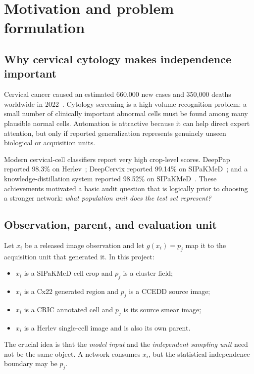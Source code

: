 \documentclass[11pt,oneside]{report}
\begin{document}
\chapter{Motivation and problem formulation}

\section{Why cervical cytology makes independence important}

Cervical cancer caused an estimated 660,000 new cases and 350,000 deaths worldwide in 2022~\cite{who2025hpv}. Cytology screening is a high-volume recognition problem: a small number of clinically important abnormal cells must be found among many plausible normal cells. Automation is attractive because it can help direct expert attention, but only if reported generalization represents genuinely unseen biological or acquisition units.

Modern cervical-cell classifiers report very high crop-level scores. DeepPap reported 98.3\% on Herlev~\cite{zhang2017deeppap}; DeepCervix reported 99.14\% on SIPaKMeD~\cite{rahaman2021deepcervix}; and a knowledge-distillation system reported 98.52\% on SIPaKMeD~\cite{gao2022knowledge}. These achievements motivated a basic audit question that is logically prior to choosing a stronger network: \emph{what population unit does the test set represent?}

\section{Observation, parent, and evaluation unit}

Let $x_i$ be a released image observation and let $g(x_i)=p_j$ map it to the acquisition unit that generated it. In this project:
\begin{itemize}
  \item $x_i$ is a SIPaKMeD cell crop and $p_j$ is a cluster field;
  \item $x_i$ is a Cx22 generated region and $p_j$ is a CCEDD source image;
  \item $x_i$ is a CRIC annotated cell and $p_j$ is its source smear image;
  \item $x_i$ is a Herlev single-cell image and is also its own parent.
\end{itemize}

The crucial idea is that the \emph{model input} and the \emph{independent sampling unit} need not be the same object. A network consumes $x_i$, but the statistical independence boundary may be $p_j$.
\end{document}
